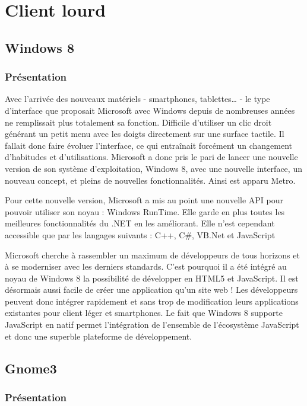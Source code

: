 \chapter{Client lourd}

\section{Windows 8}
\label{ch:windows8}

\subsection{Présentation}

Avec l'arrivée des nouveaux matériels - smartphones, tablettes… - le type d'interface que proposait Microsoft avec Windows depuis de nombreuses années ne remplissait plus totalement sa fonction. Difficile d'utiliser un clic droit générant un petit menu avec les doigts directement sur une surface tactile. Il fallait donc faire évoluer l'interface, ce qui entraînait forcément un changement d'habitudes et d'utilisations.
Microsoft a donc pris le pari de lancer une nouvelle version de son système d'exploitation, Windows 8, avec une nouvelle interface, un nouveau concept, et pleins de nouvelles fonctionnalités. Ainsi est apparu Metro.

Pour cette nouvelle version, Microsoft a mis au point une nouvelle API pour pouvoir utiliser son noyau : Windows RunTime. Elle garde en plus toutes les meilleures fonctionnalités du .NET en les améliorant. Elle n'est cependant accessible que par les langages suivants : C++, C\#, VB.Net et JavaScript

Microsoft cherche à rassembler un maximum de développeurs de tous horizons et à se moderniser avec les derniers standards. C'est pourquoi il a été intégré au noyau de Windows 8 la possibilité de développer en HTML5 et JavaScript. Il est désormais aussi facile de créer une application qu'un site web ! Les développeurs peuvent donc intégrer rapidement et sans trop de modification leurs applications existantes pour client léger et smartphones. Le fait que Windows 8 supporte JavaScript en natif permet l'intégration de l'ensemble de l'écosystème JavaScript et donc une superble plateforme de développement.

\section{Gnome3}
\label{ch:gnome3}

\subsection{Présentation}


